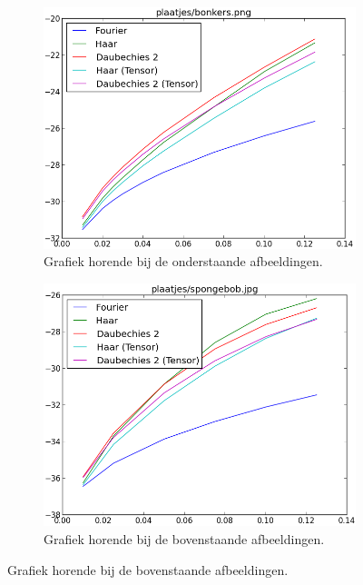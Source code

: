 \begin{figure}
	\centering
	\begin{subfigure}[t]{0.48\textwidth}
	\includegraphics[width=\linewidth]{plaatjes/grafiek_bonkers.png}
	\caption{Grafiek horende bij de onderstaande afbeeldingen.}
	\end{subfigure}
	\begin{subfigure}[t]{0.48\textwidth}
	\includegraphics[width=\linewidth]{plaatjes/grafiek_spongebob_0_15-0_01.png}
	\caption{Grafiek horende bij de bovenstaande afbeeldingen.}
	\end{subfigure}
\end{figure}

